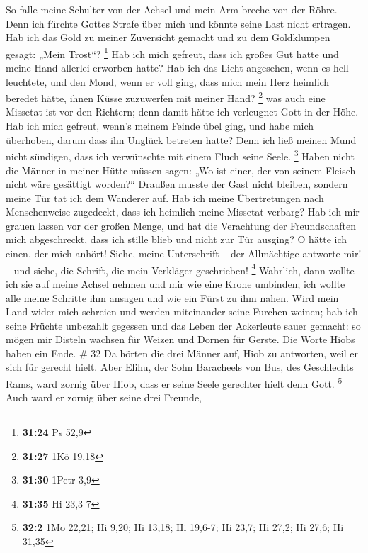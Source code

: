  So falle meine Schulter von der Achsel und mein Arm
breche von der Röhre.  Denn ich fürchte Gottes Strafe
über mich und könnte seine Last nicht ertragen.  Hab ich
das Gold zu meiner Zuversicht gemacht und zu dem Goldklumpen gesagt:
„Mein Trost``? \footnote{\textbf{31:24} Ps 52,9}  Hab ich
mich gefreut, dass ich großes Gut hatte und meine Hand allerlei erworben
hatte?  Hab ich das Licht angesehen, wenn es hell
leuchtete, und den Mond, wenn er voll ging,  dass mich
mein Herz heimlich beredet hätte, ihnen Küsse zuzuwerfen mit meiner
Hand? \footnote{\textbf{31:27} 1Kö 19,18}  was auch eine
Missetat ist vor den Richtern; denn damit hätte ich verleugnet Gott in
der Höhe.  Hab ich mich gefreut, wenn's meinem Feinde
übel ging, und habe mich überhoben, darum dass ihn Unglück betreten
hatte?  Denn ich ließ meinen Mund nicht sündigen, dass
ich verwünschte mit einem Fluch seine Seele. \footnote{\textbf{31:30}
  1Petr 3,9}  Haben nicht die Männer in meiner Hütte
müssen sagen: „Wo ist einer, der von seinem Fleisch nicht wäre gesättigt
worden?{}``  Draußen musste der Gast nicht bleiben,
sondern meine Tür tat ich dem Wanderer auf.  Hab ich
meine Übertretungen nach Menschenweise zugedeckt, dass ich heimlich
meine Missetat verbarg?  Hab ich mir grauen lassen vor
der großen Menge, und hat die Verachtung der Freundschaften mich
abgeschreckt, dass ich stille blieb und nicht zur Tür ausging?
 O hätte ich einen, der mich anhört! Siehe, meine
Unterschrift -- der Allmächtige antworte mir! -- und siehe, die Schrift,
die mein Verkläger geschrieben! \footnote{\textbf{31:35} Hi 23,3-7}
 Wahrlich, dann wollte ich sie auf meine Achsel nehmen
und mir wie eine Krone umbinden;  ich wollte alle meine
Schritte ihm ansagen und wie ein Fürst zu ihm nahen. 
Wird mein Land wider mich schreien und werden miteinander seine Furchen
weinen;  hab ich seine Früchte unbezahlt gegessen und das
Leben der Ackerleute sauer gemacht:  so mögen mir Disteln
wachsen für Weizen und Dornen für Gerste. Die Worte Hiobs haben ein
Ende. \# 32  Da hörten die drei Männer auf, Hiob zu
antworten, weil er sich für gerecht hielt.  Aber Elihu,
der Sohn Baracheels von Bus, des Geschlechts Rams, ward zornig über
Hiob, dass er seine Seele gerechter hielt denn Gott. \footnote{\textbf{32:2}
  1Mo 22,21; Hi 9,20; Hi 13,18; Hi 19,6-7; Hi 23,7; Hi 27,2; Hi 27,6; Hi
  31,35}  Auch ward er zornig über seine drei Freunde,
